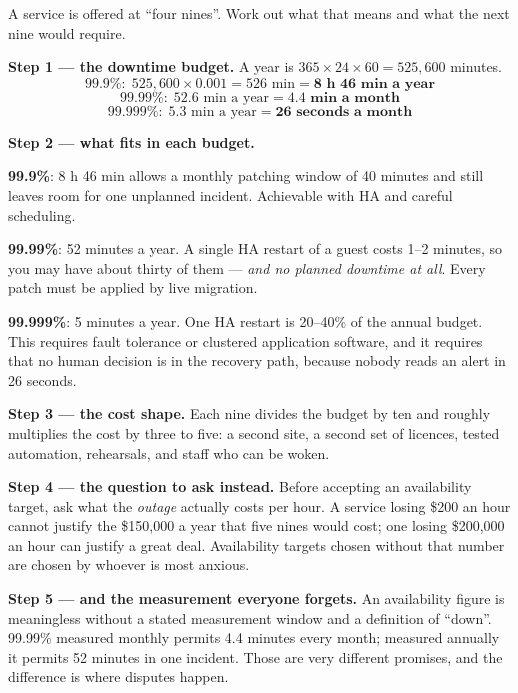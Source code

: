 \begin{worked}
A service is offered at ``four nines''. Work out what that means and what the
next nine would require.

\smallskip
\textbf{Step 1 --- the downtime budget.} A year is
$365 \times 24 \times 60 = 525{,}600$ minutes.
\[ 99.9\% : \; 525{,}600 \times 0.001 = 526 \text{ min}
   = \mathbf{8 \text{ h } 46 \text{ min a year}} \]
\[ 99.99\% : \; 52.6 \text{ min a year} = \mathbf{4.4 \text{ min a month}} \]
\[ 99.999\% : \; 5.3 \text{ min a year} = \mathbf{26 \text{ seconds a month}} \]

\smallskip
\textbf{Step 2 --- what fits in each budget.}
\begin{tight}
  \item \textbf{99.9\%}: 8 h 46 min allows a monthly patching window of 40
        minutes and still leaves room for one unplanned incident. Achievable
        with HA and careful scheduling.
  \item \textbf{99.99\%}: 52 minutes a year. A single HA restart of a guest
        costs 1--2 minutes, so you may have about thirty of them --- \emph{and
        no planned downtime at all}. Every patch must be applied by live
        migration.
  \item \textbf{99.999\%}: 5 minutes a year. One HA restart is 20--40\% of the
        annual budget. This requires fault tolerance or clustered application
        software, and it requires that no human decision is in the recovery
        path, because nobody reads an alert in 26 seconds.
\end{tight}

\smallskip
\textbf{Step 3 --- the cost shape.} Each nine divides the budget by ten and
roughly multiplies the cost by three to five: a second site, a second set of
licences, tested automation, rehearsals, and staff who can be woken.

\smallskip
\textbf{Step 4 --- the question to ask instead.} Before accepting an
availability target, ask what the \emph{outage} actually costs per hour. A
service losing \$200 an hour cannot justify the \$150{,}000 a year that five
nines would cost; one losing \$200{,}000 an hour can justify a great deal.
Availability targets chosen without that number are chosen by whoever is most
anxious.

\smallskip
\textbf{Step 5 --- and the measurement everyone forgets.} An availability
figure is meaningless without a stated measurement window and a definition of
``down''. 99.99\% measured monthly permits 4.4 minutes every month; measured
annually it permits 52 minutes in one incident. Those are very different
promises, and the difference is where disputes happen.
\end{worked}

